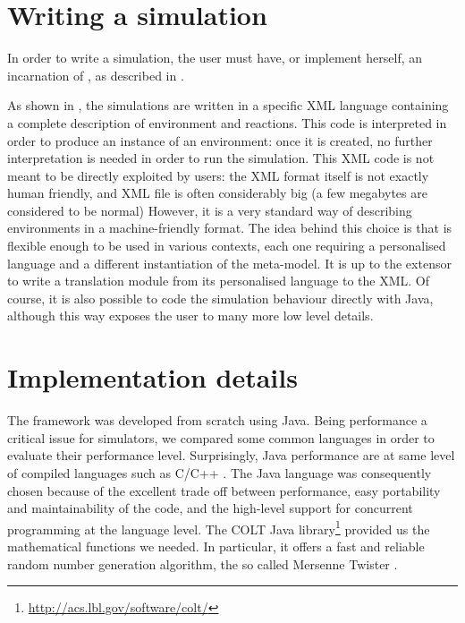 \documentclass[12pt,a4paper,twoside,openright]{book}
\begin{document}

\section{Writing a simulation}


In order to write a simulation, the user must have, or implement herself, an incarnation of \alchemist{}, as described in .

As shown in , the simulations are written in a specific XML language containing a complete description of environment and reactions.
%
This code is interpreted in order to produce an instance of an environment: once it is created, no further interpretation is needed in order to run the simulation.
%
This XML code is not meant to be directly exploited by users: the XML format itself is not exactly human friendly, and XML file is often considerably big (a few megabytes are considered to be normal)
%
However, it is a very standard way of describing environments in a machine-friendly format.
%
The idea behind this choice is that \alchemist{} is flexible enough to be used in various contexts, each one requiring a personalised language and a different instantiation of the meta-model.
%
It is up to the extensor to write a translation module from its personalised language to the \alchemist{} XML.
%
Of course, it is also possible to code the simulation behaviour  directly with Java, although this way exposes the user to many more low level details.

\section{Implementation details}
The framework was developed from scratch using Java. Being performance a critical issue for simulators, we compared some common languages in order to evaluate their performance level.
%
Surprisingly, Java performance are at same level of compiled languages such as C/C++ \cite{bull2003, oancea2011}.
%
The Java language was consequently chosen because of the excellent trade off between performance, easy portability and maintainability of the code, and the high-level support for concurrent programming at the language level. 
%
The COLT Java library\footnote{\url{http://acs.lbl.gov/software/colt/}} provided us the mathematical functions we needed.
%
In particular, it offers a fast and reliable random number generation algorithm, the so called Mersenne Twister \cite{matsumoto1998}.
\end{document}
